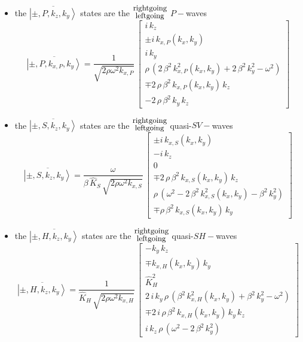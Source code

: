 \documentclass[11pt,a4paper]{article}
\begin{document}
\begin{itemize}
\item the $\overline{\left|\pm,P, k_{z},k_{y}  \right\rangle}$ states
are the   ${\stackrel{\mbox{\small rightgoing}}{{}_{\mbox{\small
leftgoing}}}}$  $P-$waves
\begin{equation} \label{Pxeigen}
\overline{\left|\pm,P, k_{x,P},k_{y}  \right\rangle}=\frac{1}{\sqrt{2 \rho {\omega }^{  2}{  k}_{
x, P }}}\,\left[\begin{array}{c}
i\,{k}_{z}\\ \pm i\,k_{x,P}(k_x,k_y)\\i\,k_{y}\\
  \rho \,\left( 2\,{\beta^2}\,{k_{x,P}^2(k_x,k_y)} + 2\,{\beta^2}\,{k_{y}^2} -
     {\omega^2} \right) \\ \mp 2\,\rho\,{\beta^2}\,k_{x,P}(k_x,k_y)\,{k}_{z} \\
  - 2\,\rho\,{\beta^2}\,k_{y}\,{k}_{z} \end{array}\right]
\end{equation}

\item the $\overline{\left|\pm,S, k_{z},k_{y}  \right\rangle}$ states
are the   ${\stackrel{\mbox{\small rightgoing}}{{}_{\mbox{\small
leftgoing}}}}$  quasi-$SV-$waves
\begin{equation} \label{SVxeigen}
\overline{\left|\pm,S, k_{z},k_{y}  \right\rangle}=\frac{\omega}{\beta\,\hat{K}_{S }\,
\sqrt{2 \rho {\omega }^{  2}  {  k}_{
x, S }}}\,
\left[\begin{array}{c}
\pm i\,k_{x,S}(k_x,k_y)\\
- i\,{k}_{z}\\0\\
\mp 2\,\rho\,{\beta^2}\,k_{x,S}(k_x,k_y)\,{k}_{z} \\
  \rho \,\left({\omega^2} -2\,{\beta^2}\,{k_{x,S}^2(k_x,k_y)} - {\beta^2}\,{k_{y}^2}  \right) \\
  \mp \rho\,{\beta^2}\,k_{x,S}(k_x,k_y)\,k_{y} \end{array}\right]
\end{equation}

\item the $\overline{\left|\pm,H, k_{z},k_{y}  \right\rangle}$ states
are the   ${\stackrel{\mbox{\small rightgoing}}{{}_{\mbox{\small
leftgoing}}}}$  quasi-$SH-$waves
\begin{equation} \label{SHxeigen}
\overline{\left|\pm,H, k_{z},k_{y}  \right\rangle}=
\frac{1}{\hat{K}_{H }\, \sqrt{2 \rho {\omega }^{  2}  {  k}_{
x, H }}} \,\left[\begin{array}{c}
- k_{y}\,{k}_{z} \\\mp k_{x,H}(k_x,k_y)\,k_{y} \\
  \hat{K}_{H}^2\\
2\,i\,k_{y}\,\rho \,\left({\beta^2}\,{k_{x,H}^2(k_x,k_y)} +
     {\beta^2}\,{k_{y}^2} - {\omega^2} \right) \\
  \mp  2\,i\,\rho\,{\beta^2}\,k_{x,H}(k_x,k_y)\,k_{y}\,{k}_{z}\\
   i\,{k}_{z}\,\rho \,\left(  {\omega^2} -2\,{\beta^2}\,{k_{y}^2} \right) \end{array}\right]
\end{equation}
\end{itemize}
\end{document}

